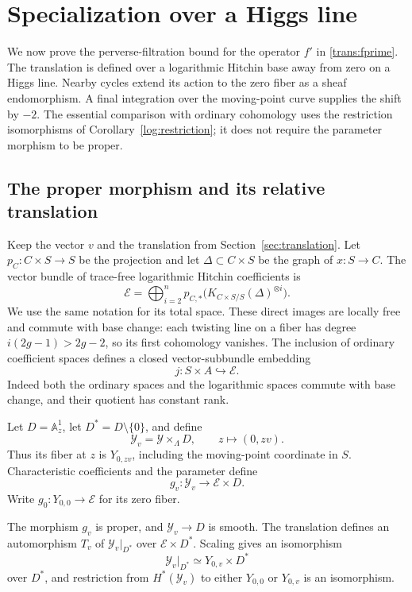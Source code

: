 \section{Specialization over a Higgs line}\label{sec:specialization}

We now prove the perverse-filtration bound for the operator $f'$ in
\eqref{trans:fprime}.  The translation is defined over a logarithmic Hitchin
base away from zero on a Higgs line.  Nearby cycles extend its action to the
zero fiber as a sheaf endomorphism.  A final integration over the moving-point
curve supplies the shift by $-2$.  The essential comparison with ordinary
cohomology uses the restriction isomorphisms of
Corollary~\ref{log:restriction}; it does not require the parameter morphism
to be proper.

\subsection{The proper morphism and its relative translation}

Keep the vector $v$ and the translation from Section~\ref{sec:translation}.
Let $p_C:C\times S\to S$ be the projection and let $\Delta\subset C\times S$
be the graph of $x:S\to C$.  The vector bundle of trace-free logarithmic
Hitchin coefficients is
\[
 \mathcal E=
 \bigoplus_{i=2}^n
 p_{C,*}\bigl(K_{C\times S/S}(\Delta)^{\otimes i}\bigr).
\]
We use the same notation for its total space.  These direct images are locally
free and commute with base change: each twisting line on a fiber has degree
$i(2g-1)>2g-2$, so its first cohomology vanishes.  The inclusion of ordinary
coefficient spaces defines a closed vector-subbundle embedding
\[
 j:S\times A\hookrightarrow\mathcal E.
\]
Indeed both the ordinary spaces and the logarithmic spaces commute with base
change, and their quotient has constant rank.

Let $D=\mathbb A^1_z$, let $D^*=D\setminus\{0\}$, and define
\[
 \mathcal Y_v=\mathcal Y\times_{\Lambda}D,
 \qquad z\longmapsto(0,zv).
\]
Thus its fiber at $z$ is $Y_{0,zv}$, including the moving-point coordinate in
$S$.  Characteristic coefficients and the parameter define
\begin{equation}\label{spec:hitchin-line}
 g_v:\mathcal Y_v\longrightarrow\mathcal E\times D.
\end{equation}
Write $g_0:Y_{0,0}\to\mathcal E$ for its zero fiber.

\begin{lemma}\label{spec:geometry}
The morphism $g_v$ is proper, and $\mathcal Y_v\to D$ is smooth.  The
translation defines an automorphism $T_v$ of $\mathcal Y_v|_{D^*}$ over
$\mathcal E\times D^*$.  Scaling gives an isomorphism
\[
 \mathcal Y_v|_{D^*}\simeq Y_{0,v}\times D^*
\]
over $D^*$, and restriction from $H^*(\mathcal Y_v)$ to either $Y_{0,0}$ or
$Y_{0,v}$ is an isomorphism.
\end{lemma}

